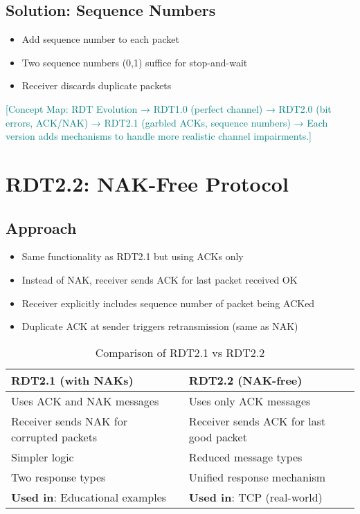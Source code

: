 \documentclass[12pt]{article}
\begin{document}
\subsection{Solution: Sequence Numbers}
\begin{itemize}
    \item Add sequence number to each packet
    \item Two sequence numbers (0,1) suffice for stop-and-wait
    \item Receiver discards duplicate packets
\end{itemize}

\textcolor{teal}{[Concept Map: RDT Evolution → RDT1.0 (perfect channel) → RDT2.0 (bit errors, ACK/NAK) → RDT2.1 (garbled ACKs, sequence numbers) → Each version adds mechanisms to handle more realistic channel impairments.]}

\section{RDT2.2: NAK-Free Protocol}

\subsection{Approach}
\begin{itemize}
    \item Same functionality as RDT2.1 but using ACKs only
    \item Instead of NAK, receiver sends ACK for last packet received OK
    \item Receiver explicitly includes sequence number of packet being ACKed
    \item Duplicate ACK at sender triggers retransmission (same as NAK)
\end{itemize}

\begin{table}[h]
    \centering
    \begin{tabular}{p{}p{}}
        \toprule
        \textbf{RDT2.1 (with NAKs)}              & \textbf{RDT2.2 (NAK-free)}              \\
        \midrule
        Uses ACK and NAK messages                & Uses only ACK messages                  \\
        Receiver sends NAK for corrupted packets & Receiver sends ACK for last good packet \\
        Simpler logic                            & Reduced message types                   \\
        Two response types                       & Unified response mechanism              \\
        \textbf{Used in}: Educational examples   & \textbf{Used in}: TCP (real-world)      \\
        \bottomrule
    \end{tabular}
    \caption{Comparison of RDT2.1 vs RDT2.2}
    \label{tab:rdt21_vs_rdt22}
\end{table}
\end{document}
